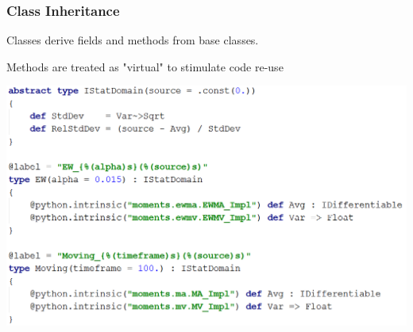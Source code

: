 \documentclass{beamer}
\begin{document}
\begin{frame}
\frametitle{Class Inheritance}
Classes derive fields and methods from base classes.

Methods are treated as "virtual" to stimulate code re-use

\includegraphics[width=1\linewidth]{moments.png}
\end{frame}
\end{document}
